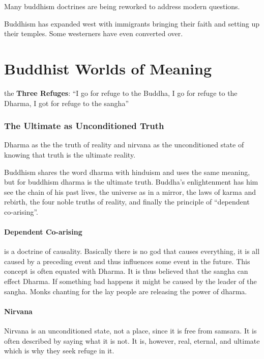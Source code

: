\documentclass{article}
\begin{document}
Many buddhism doctrines are being reworked to address modern questions.

Buddhism has expanded west with immigrants bringing their faith and setting up their temples. Some westerners  have even converted over.

\section{Buddhist Worlds of Meaning}
\label{sec:buddhist_worlds_of_meaning}
the \textbf{Three Refuges}: ``I go for refuge to the Buddha, I go for refuge to the Dharma, I got for refuge to the sangha''

\subsubsection{The Ultimate as Unconditioned Truth}
\label{ssub:the_ultimate_as_unconditioned_truth}
Dharma as the the truth of reality and nirvana as the unconditioned state of knowing that truth is the ultimate reality.

Buddhism shares the word dharma with hinduism and uses the same meaning, but for buddhism dharma is the ultimate truth. Buddha's enlightenment has him see the chain of his past lives, the universe as in a mirror, the laws of karma and rebirth, the four noble truths of reality, and finally the principle of ``dependent co-arising''.

\paragraph{Dependent Co-arising}
\label{par:dependent_co_arising}
is a doctrine of causality. Basically there is no god that causes everything, it is all caused by a preceding event and thus influences some event in the future. This concept is often equated with Dharma. It is thus believed that the sangha can effect Dharma. If something bad happens it might be caused by the leader of the sangha. Monks chanting for the lay people are releasing the power of dharma.

\paragraph{Nirvana}
\label{par:nirvana}
Nirvana is an unconditioned state, not a place, since it is free from samsara. It is often described by saying what it is not. It is, however, real, eternal, and ultimate which is why they seek refuge in it.
\end{document}
